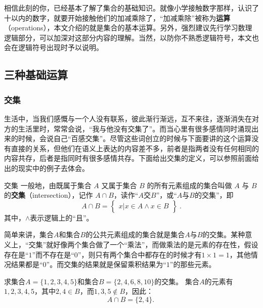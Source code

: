 
\begin{issues}
\issueDraft
\end{issues}
相信此刻的你，已经基本了解了集合的基础知识。就像小学接触数字那样，认识了十以内的数字，就要开始接触他们的加减乘除了，“加减乘除”被称为\textbf{运算}（operations），本文介绍的就是集合的基本运算。另外，强烈建议先行学习数理逻辑部分，可以加深对这部分内容的理解。当然，以防你不熟悉逻辑符号，本文也会在逻辑符号出现时予以说明。

\subsection{三种基础运算}

\subsubsection{交集}

生活中，当我们感慨与一个人没有联系，彼此渐行渐远，互不来往，逐渐消失在对方的生活里时，常常会说，“我与他没有交集了”。而当心里有很多感情同时涌现出来的时候，会说自己“百感交集”。尽管这些词创立的时候与下面要讲的这个运算没有直接的关系，但他们在语义上表达的内容差不多，前者是指两者没有任何相同的内容共存，后者是指同时有很多感情共存。下面给出交集的定义，可以参照前面给出的现实中的例子去体会。

\begin{definition}{交集}
一般地，由既属于集合 $A$ 又属于集合 $B$ 的所有元素组成的集合叫做 $A$ 与 $B$ 的\textbf{交集}（intersection），记作 $A \cap B$，读作“$A$交$B$”，或“$A$与$B$的交集”，即
\begin{equation}
A\cap B = \begin{Bmatrix} x|x\in A\land x\in B \end{Bmatrix}~.
\end{equation}
其中，$\land$表示逻辑上的“且”。
\end{definition}
简单来讲，集合$A$和集合$B$的公共元素组成的集合就是集合$A$与$B$的交集。某种意义上，“交集”就好像两个集合做了一个“乘法”，而做乘法的是元素的存在性，假设存在是“$1$”而不存在是“$0$”，则只有两个集合中都存在的时候才有$1\times 1=1$，其他情况结果都是“$0$”。而交集的结果就是保留乘积结果为“$1$”的那些元素。

\begin{example}{求集合$A=\{1,2,3,4,5\}$和集合$B=\{2,4,6,8,10\}$的交集。}
集合$A$的元素有$1,2,3,4,5$，其中$2,4\in B$，而$1,3,5\notin B$，因此：
$$
A\cap B=\{2,4\}.~
$$
\end{example}
